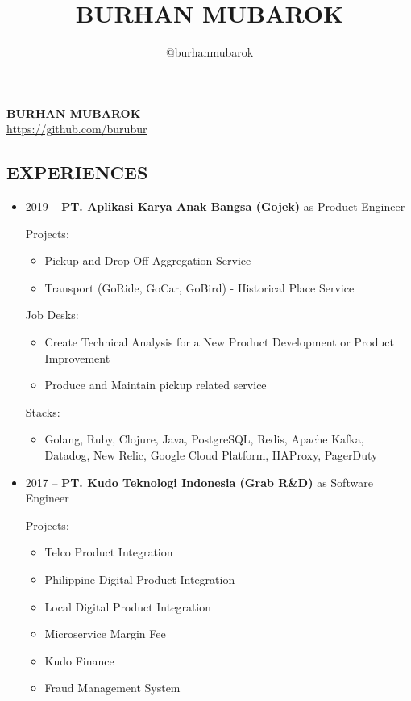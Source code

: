 \documentclass[11pt,a4paper,english]{article}
\title{BURHAN MUBAROK}
\author{@burhanmubarok}
\begin{document}
\begin{center}
\textbf{\large BURHAN MUBAROK}\\
\url{https://github.com/burubur}
\end{center}
\hspace{7mm}

\subsection*{EXPERIENCES}
\begin{itemize}
    \item 2019 -- \textbf{PT. Aplikasi Karya Anak Bangsa (Gojek)} as Product Engineer
	\par Projects:
	\begin{itemize}
	    \item Pickup and Drop Off Aggregation Service
	    \item Transport (GoRide, GoCar, GoBird) - Historical Place Service
	\end{itemize}
	\par Job Desks:
	\begin{itemize}
	    \item Create Technical Analysis for a New Product Development or Product Improvement
	    \item Produce and Maintain pickup related service
	\end{itemize}
	\par Stacks:
	\begin{itemize}
	 \item Golang, Ruby, Clojure, Java, PostgreSQL, Redis, Apache Kafka, Datadog, New Relic, Google Cloud Platform, HAProxy, PagerDuty
	\end{itemize}
	\item 2017 -- \textbf{PT. Kudo Teknologi Indonesia (Grab R\&D)} as Software Engineer
	\par Projects:
	\begin{itemize}
	    \item Telco Product Integration
	    \item Philippine Digital Product Integration
	    \item Local Digital Product Integration
		\item Microservice Margin Fee
		\item Kudo Finance
		\item Fraud Management System

\end{itemize}
\end{itemize}
\end{document}
